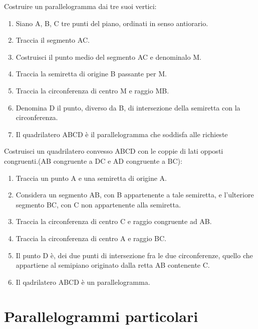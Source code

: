 \begin{procedura}
  Costruire un parallelogramma dai tre suoi vertici:
  \begin{enumerate} [nosep]
    \item 
    Siano A, B, C tre punti del piano, ordinati in senso antiorario.
    \item 
    Traccia il segmento AC.
    \item 
    Costruisci il punto medio del segmento AC e denominalo M.
    \item 
    Traccia la semiretta di origine B passante per M.
    \item 
    Tracci­a la circonferenza di centro M e raggio MB.
    \item 
    Denomina D il punto,  diverso da B, di intersezione della semiretta con la 
circonferenza.
    \item 
    Il quadrilatero ABCD è il parallelogramma che soddisfa alle richieste
  \end{enumerate}
\end{procedura}


\begin{procedura}
  Costruisci un quadrilatero convesso ABCD con le coppie di lati opposti 
congruenti.(AB congruente a DC e AD congruente a BC):
  \begin{enumerate} [nosep]
    \item 
    Traccia un punto A e una semiretta di origine A.
    \item 
    Considera un segmento AB, con B appartenente a tale semiretta, e 
l'ulteriore segmento BC, con C non appartenente alla semiretta.
    \item 
    Traccia la circonferenza di centro C e raggio congruente ad AB.
    \item 
    Traccia la circonferenza di centro A e raggio BC.
    
    \item
    Il punto D è, dei due punti di intersezione fra le due circonferenze, 
quello che appartiene al semipiano originato dalla retta AB contenente C.
    \item 
    Il qadrilatero ABCD è un parallelogramma.
\end{enumerate}
\end{procedura}

\newpage %

\section{Parallelogrammi particolari}
  \label{sect:parallelogrammi_particolari}

